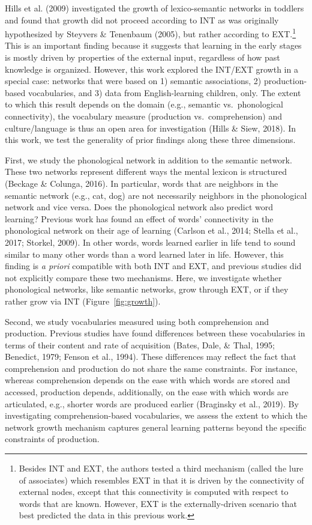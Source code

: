 \documentclass[english,,man,floatsintext]{apa6}
\let\rmarkdownfootnote\footnote%
\def\footnote{\protect\rmarkdownfootnote}
\begin{document}
Hills et al. (2009) investigated the growth of lexico-semantic networks in toddlers and found that growth did not proceed according to INT as was originally hypothesized by Steyvers \& Tenenbaum (2005), but rather according to EXT.\footnote{Besides INT and EXT, the authors tested a third mechanism (called the lure of associates) which resembles EXT in that it is driven by the connectivity of external nodes, except that this connectivity is computed with respect to words that are known. However, EXT is the externally-driven scenario that best predicted the data in this previous work.} This is an important finding because it suggests that learning in the early stages is mostly driven by properties of the external input, regardless of how past knowledge is organized. However, this work explored the INT/EXT growth in a special case: networks that were based on 1) semantic associations, 2) production-based vocabularies, and 3) data from English-learning children, only. The extent to which this result depends on the domain (e.g., semantic vs.~phonological connectivity), the vocabulary measure (production vs.~comprehension) and culture/language is thus an open area for investigation (Hills \& Siew, 2018). In this work, we test the generality of prior findings along these three dimensions.

First, we study the phonological network in addition to the semantic network. These two networks represent different ways the mental lexicon is structured (Beckage \& Colunga, 2016). In particular, words that are neighbors in the semantic network (e.g., cat, dog) are not necessarily neighbors in the phonological network and vice versa. Does the phonological network also predict word learning? Previous work has found an effect of words' connectivity in the phonological network on their age of learning (Carlson et al., 2014; Stella et al., 2017; Storkel, 2009). In other words, words learned earlier in life tend to sound similar to many other words than a word learned later in life. However, this finding is \emph{a priori} compatible with both INT and EXT, and previous studies did not explicitly compare these two mechanisms. Here, we investigate whether phonological networks, like semantic networks, grow through EXT, or if they rather grow via INT (Figure~\ref{fig:growth}).

Second, we study vocabularies measured using both comprehension and production. Previous studies have found differences between these vocabularies in terms of their content and rate of acquisition (Bates, Dale, \& Thal, 1995; Benedict, 1979; Fenson et al., 1994). These differences may reflect the fact that comprehension and production do not share the same constraints. For instance, whereas comprehension depends on the ease with which words are stored and accessed, production depends, additionally, on the ease with which words are articulated, e.g., shorter words are produced earlier (Braginsky et al., 2019). By investigating comprehension-based vocabularies, we assess the extent to which the network growth mechanism captures general learning patterns beyond the specific constraints of production.
\end{document}
